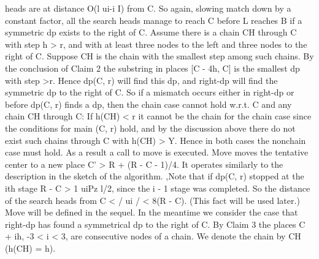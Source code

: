 \documentclass[11pt,a4paper]{report}
\begin{document}
heads are at distance O(l ui-i I) from C. So again, slowing match down by a constant
factor, all the search heads manage to reach C before L reaches B if a symmetric dp
exists to the right of C.
Assume there is a chain CH through C with step h > r, and with at least three nodes
to the left and three nodes to the right of C. Suppose CH is the chain with the smallest
step among such chains. By the conclusion of Claim 2 the substring in places [C - 4h, C]
is the smallest dp with step >r. Hence dp(C, r) will find this dp, and right-dp will find
the symmetric dp to the right of C. So if a mismatch occurs either in right-dp or before
dp(C, r) finds a dp, then the chain case cannot hold w.r.t. C and any chain CH through
C: If h(CH) < r it cannot be the chain for the chain case since the conditions for main
(C, r) hold, and by the discussion above there do not exist such chains through C with
h(CH) > Y. Hence in both cases the nonchain case must hold. As a result a call to move
is executed. Move moves the tentative center to a new place C’ > R + (R - C - 1)/4.
It operates similarly to the description in the sketch of the algorithm. ,Note that if dp(C, r)
stopped at the ith stage R - C > 1 uiPz l/2, since the i - 1 stage was completed. So the
distance of the search heads from C < / ui / < 8(R - C). (This fact will be used later.)
Move will be defined in the sequel. In the meantime we consider the case that right-dp
has found a symmetrical dp to the right of C. By Claim 3 the places C + ih, -3 < i < 3,
are consecutive nodes of a chain. We denote the chain by CH (h(CH) = h). 
\end{document}
